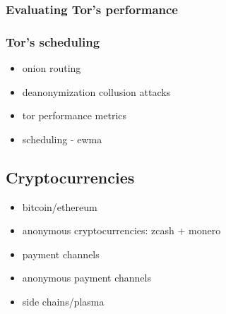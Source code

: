 \subsubsection{Evaluating Tor's performance}

\subsubsection{Tor's scheduling}

\begin{itemize}
\item onion routing
\item deanonymization collusion attacks
\item tor performance  metrics
\item scheduling - ewma
\end{itemize}

\subsection{Cryptocurrencies}

\begin{itemize}
\item bitcoin/ethereum~\cite{nakamoto2008bitcoin}~\cite{wood2014ethereum}
\item anonymous cryptocurrencies: zcash + monero
\item payment channels
\item anonymous payment channels
\item side chains/plasma
\end{itemize}

